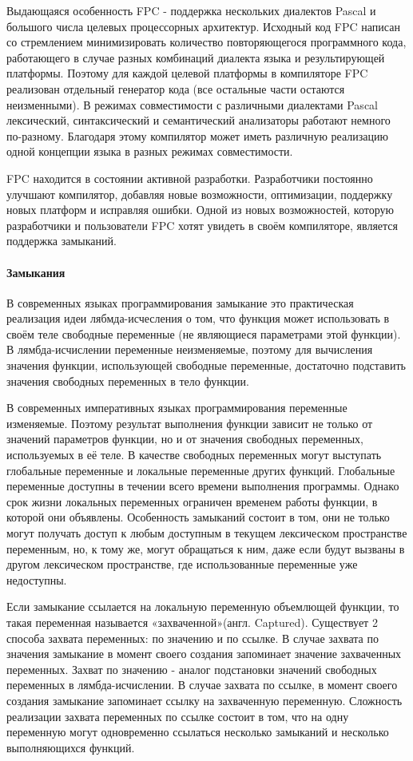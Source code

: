 \documentclass{imcs}
\begin{document}
Выдающаяся особенность FPC - поддержка нескольких диалектов Pascal 
и большого числа целевых процессорных архитектур. Исходный код FPC написан со
стремлением минимизировать количество повторяющегося программного кода,
работающего в случае разных комбинаций
диалекта языка и результирующей платформы. Поэтому для каждой целевой платформы
в компиляторе FPC реализован отдельный генератор кода (все остальные части остаются
неизменными). В режимах совместимости с различными диалектами Pascal лексический,
синтаксический и семантический анализаторы работают немного по-разному. Благодаря этому
компилятор может иметь различную реализацию одной концепции языка в разных режимах
совместимости.

FPC находится в состоянии активной разработки. Разработчики постоянно улучшают компилятор,
добавляя новые возможности, оптимизации, поддержку новых платформ и исправляя ошибки\cite{fpc}. Одной из новых возможностей, которую разработчики и пользователи FPC хотят увидеть в
своём компиляторе, является поддержка замыканий.

\paragraph{Замыкания} В современных языках программирования замыкание это практическая реализация
идеи лябмда-исчесления о том, что функция может использовать в своём теле свободные
переменные (не являющиеся параметрами этой функции). В лямбда-исчислении
переменные неизменяемые, поэтому для вычисления значения функции, использующей
свободные переменные, достаточно подставить значения свободных переменных в тело
функции.

В современных императивных языках программирования переменные изменяемые.
Поэтому результат выполнения функции зависит не только от значений параметров
функции, но и от значения свободных переменных, используемых в её теле. В качестве
свободных переменных могут выступать глобальные переменные и локальные переменные
других функций. Глобальные переменные доступны в течении всего времени выполнения программы.
Однако срок жизни
локальных переменных ограничен временем работы функции, в которой они объявлены.
Особенность замыканий состоит в том, они не только могут получать доступ к любым
доступным в текущем лексическом пространстве переменным, но, к тому же, могут
обращаться к ним, даже если будут вызваны в другом лексическом пространстве, где
использованные переменные уже недоступны.

Если замыкание ссылается на локальную переменную объемлющей функции, то такая переменная 
называется «захваченной»(англ. Captured)\cite{anonymmethods}\cite{cpp}. Существует 2
способа захвата переменных: по значению и по ссылке. В случае захвата по значения
замыкание в момент своего создания запоминает значение захваченных переменных.
Захват по значению - аналог подстановки значений свободных переменных в лямбда-исчислении.
В случае захвата по ссылке, в момент своего создания замыкание запоминает ссылку 
на захваченную переменную. Сложность реализации захвата переменных по ссылке состоит в том,
что на одну переменную могут одновременно ссылаться несколько замыканий и несколько
выполняющихся функций.
\end{document}

